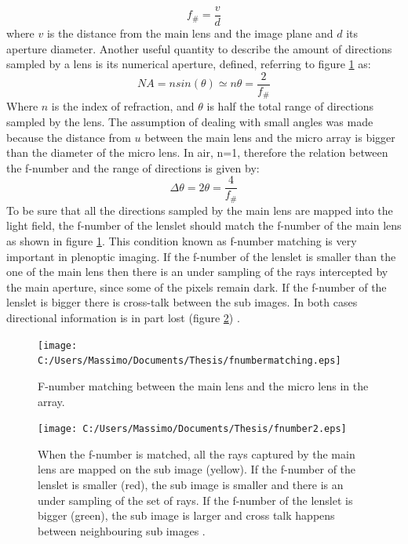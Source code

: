 \begin{equation}
\label{eq:f_num}
f_{\#} = \dfrac{v}{d}
\end{equation} 
where $v$ is the distance from the main lens and the image plane and $d$ its aperture diameter. Another useful quantity to describe the amount of directions sampled by a lens is its numerical aperture, defined, referring to figure \ref{fig:plenoptic5} as:
\begin{equation}
\label{eq:NA}
NA=n sin(\theta)\simeq n \theta =\dfrac{2}{f_{\#}}
\end{equation}
Where $n$ is the index of refraction, and $\theta$ is half the total range of directions sampled by the lens. The assumption of dealing with small angles was made because the distance from $u$ between the main lens and the micro array is bigger than the diameter of the micro lens. In air, n=1, therefore the relation between the f-number and the range of directions is given by:
\begin{equation}
\label{eq:fnum1}
\Delta\theta= 2\theta=\dfrac{4}{f_{\#}}
\end{equation}
 To be sure that all the directions sampled by the main lens are mapped into the light field, the f-number of the lenslet should match the f-number of the main lens \cite{ng2005light} as shown in figure \ref{fig:plenoptic5}. This condition known as f-number matching is very important in plenoptic imaging. If the f-number of the lenslet is smaller than the one of the main lens then there is an under sampling of the rays intercepted by the main aperture, since some of the pixels remain dark. If the f-number of the lenslet is bigger there is cross-talk between the sub images. In both cases directional information is in part lost (figure \ref{fig:plenoptic7}) .
\begin{figure}[H]
	\centering
	\texttt{[image: C:/Users/Massimo/Documents/Thesis/fnumbermatching.eps]}
	\caption{\label{fig:plenoptic5}F-number matching between the main lens and the micro lens in the array.  }
\end{figure}
\begin{figure}[H]
	\centering
	\texttt{[image: C:/Users/Massimo/Documents/Thesis/fnumber2.eps]}
	\caption{\label{fig:plenoptic7}When the f-number is matched, all the rays captured by the main lens are mapped on the sub image (yellow). If the f-number of the lenslet is smaller (red), the sub image is smaller and there is an under sampling of the set of rays. If the f-number of the lenslet is bigger (green), the sub image is larger and cross talk happens between neighbouring sub images .  }
\end{figure}
\newpage
